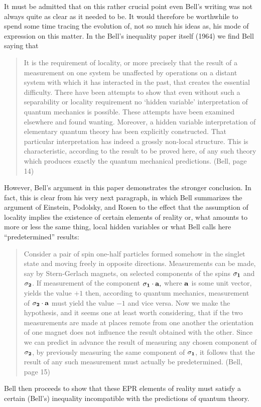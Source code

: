 \documentclass[12pt]{article}
\newcommand\bq{\begin{quotation}}
\newcommand\eq{\end{quotation}}
\newcommand\sig{\bf\sigma}
\begin{document}
It must be admitted that on this rather crucial point even Bell's writing
was not always quite as clear as it needed to be.  It would therefore be
worthwhile to spend some time tracing the evolution of, not so much his
ideas as, his mode of expression on this matter.  In the Bell's inequality
paper itself (1964) we find Bell saying that

\bq \noindent It is the requirement of locality, or more precisely that the
result of a measurement on one system be unaffected by operations on a
distant system with which it has interacted in the past, that creates the
essential difficulty. There have been attempts to show that even without
such a separability or locality requirement no `hidden variable'
interpretation of quantum mechanics is possible. These attempts have been
examined elsewhere and found wanting. Moreover, a hidden variable
interpretation of elementary quantum theory has been explicitly
constructed. That particular interpretation has indeed a grossly non-local
structure. This is characteristic, according to the result to be proved
here, of any such theory which produces exactly the quantum mechanical
predictions. (Bell, page 14)
\eq
However, Bell's argument in this paper demonstrates the stronger
conclusion. In fact, this is clear from his very next paragraph, in which
Bell summarizes the argument of Einstein, Podolsky, and Rosen to the effect
that the assumption of locality implies the existence of certain elements
of reality or, what amounts to more or less the same thing, local hidden
variables or what Bell calls here ``predetermined'' results:

\bq \noindent Consider a pair of spin one-half particles formed somehow in
the singlet state and moving freely in opposite directions. Measurements
can be made, say by Stern-Gerlach magnets, on selected components of the
spins $\sig_1$ and   $\sig_2$. If measurement of the component
$\sig_1\cdot\bf a,$ where $\bf a$ is some unit vector, yields the value
$+1$ then, according to quantum mechanics,  measurement of
$\sig_2\cdot\bf a$ must yield the value $-1$ and vice versa. Now we make
the hypothesis, and it seems one at least worth considering, that if the
two  measurements are made at places remote from one another the orientation
of one magnet does not influence the result obtained with the other. Since
we can predict in advance the result of measuring any chosen component of
$\sig_2$, by previously measuring the same component of $\sig_1$, it
follows that the result of any such measurement must actually be
predetermined. (Bell, page 15)
\eq
Bell then proceeds to show that these EPR elements of reality must satisfy
a certain (Bell's) inequality incompatible with the predictions of quantum
theory.
\end{document}
